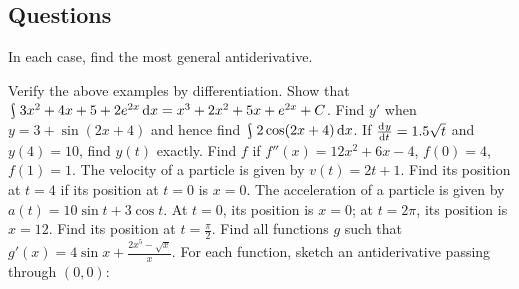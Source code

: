 \subsection*{Questions}
\begin{questions}
  \questioA In each case, find the most general antiderivative.
  \questioA Verify the above examples by differentiation.
  \questioA Show that $ \rint 3x^2 + 4x + 5 + 2e^{2x} \dif{x} = x^3 + 2x^2 + 5x + e^{2x} + C $.
  \questioA Find $ y' $ when $ y = 3 + \sin (2x + 4) $ and hence find $ \rint 2 \cos(2x + 4) \dif{x} $.
  \questioA If $ \od{y}{t} = 1.5 \sqrt{t} $ and $ y(4) = 10 $, find $ y(t) $ exactly.
  \questioM Find $ f $ if $ f''(x) = 12x^2 + 6x - 4 $, $ f(0) = 4 $, $ f(1) = 1 $.
  \questioA The velocity of a particle is given by $ v(t) = 2t + 1 $. Find its position at $ t = 4 $
            if its position at $ t = 0 $ is $ x = 0 $.
  \questioM The acceleration of a particle is given by $ a(t) = 10\sin t + 3\cos t $. At $ t = 0 $, its position is $ x = 0 $; at $ t = 2\pi $,
            its position is $ x = 12 $. Find its position at $ t = \frac{\pi}{2} $.
  \questioA Find all functions $ g $ such that $ g'(x) = 4 \sin x + \frac{2x^5 - \sqrt{x}}{x} $.
  \clearpage
  \questioM For each function, sketch an antiderivative passing through $ (0, 0) $:


\end{questions}
